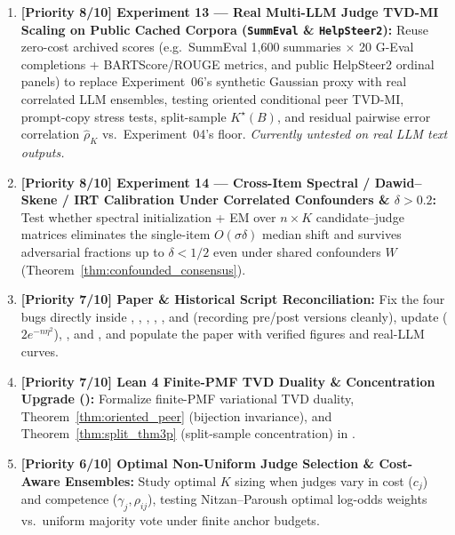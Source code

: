 \documentclass[11pt]{article}
\begin{document}
\begin{enumerate}[leftmargin=*,itemsep=3pt]
\item \textbf{[Priority 8/10] Experiment 13 — Real Multi-LLM Judge TVD-MI Scaling on Public Cached Corpora (\texttt{SummEval} \& \texttt{HelpSteer2}):} Reuse zero-cost archived scores (e.g.\ SummEval 1,600 summaries $\times$ 20 G-Eval completions + BARTScore/ROUGE metrics, and public HelpSteer2 ordinal panels) to replace Experiment~06's synthetic Gaussian proxy with real correlated LLM ensembles, testing oriented conditional peer TVD-MI, prompt-copy stress tests, split-sample $K^\star(B)$, and residual pairwise error correlation $\hat{\rho}_K$ vs.\ Experiment~04's floor. \emph{Currently untested on real LLM text outputs.}
\item \textbf{[Priority 8/10] Experiment 14 — Cross-Item Spectral / Dawid--Skene / IRT Calibration Under Correlated Confounders \& $\delta > 0.2$:} Test whether spectral initialization + EM over $n \times K$ candidate--judge matrices eliminates the single-item $O(\sigma\delta)$ median shift and survives adversarial fractions up to $\delta < 1/2$ even under shared confounders $W$ (Theorem~\ref{thm:confounded_consensus}).
\item \textbf{[Priority 7/10] Paper \& Historical Script Reconciliation:} Fix the four bugs directly inside , , , , , and  (recording pre/post versions cleanly), update  ($2e^{-n\eta^2}$), , and , and populate the paper with verified figures and real-LLM curves.
\item \textbf{[Priority 7/10] Lean 4 Finite-PMF TVD Duality \& Concentration Upgrade ():} Formalize finite-PMF variational TVD duality, Theorem~\ref{thm:oriented_peer} (bijection invariance), and Theorem~\ref{thm:split_thm3p} (split-sample concentration) in .
\item \textbf{[Priority 6/10] Optimal Non-Uniform Judge Selection \& Cost-Aware Ensembles:} Study optimal $K$ sizing when judges vary in cost ($c_j$) and competence ($\gamma_j, \rho_{ij}$), testing Nitzan--Paroush optimal log-odds weights vs.\ uniform majority vote under finite anchor budgets.
\end{enumerate}
\end{document}
